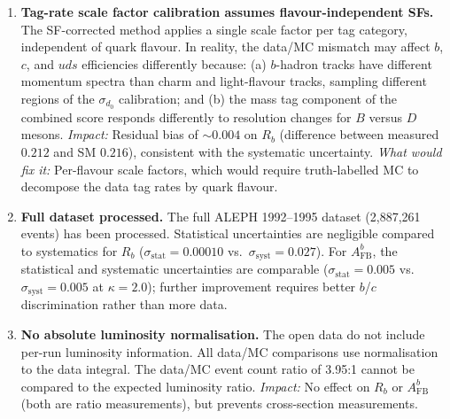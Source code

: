 \documentclass[11pt,a4paper]{article}
\begin{document}
\begin{enumerate}
\item \textbf{Tag-rate scale factor calibration assumes
  flavour-independent SFs.}
  The SF-corrected method applies a single scale factor per
  tag category, independent of quark flavour.
  In reality, the data/MC mismatch may affect $b$, $c$, and
  $uds$ efficiencies differently because:
  (a) $b$-hadron tracks have different momentum spectra than
  charm and light-flavour tracks, sampling different regions of
  the $\sigma_{d_0}$ calibration; and
  (b) the mass tag component of the combined score responds
  differently to resolution changes for $B$ versus $D$ mesons.
  \textit{Impact:} Residual bias of $\sim 0.004$ on $R_b$
  (difference between measured $0.212$ and SM $0.216$),
  consistent with the systematic uncertainty.
  \textit{What would fix it:} Per-flavour scale factors, which
  would require truth-labelled MC to decompose the data tag rates
  by quark flavour.

\item \textbf{Full dataset processed.}
  The full ALEPH 1992--1995 dataset (2,887,261 events) has been
  processed.  Statistical uncertainties are negligible compared
  to systematics for $R_b$ ($\sigma_\text{stat} = 0.00010$ vs.\
  $\sigma_\text{syst} = 0.027$).
  For $A_\text{FB}^b$, the statistical and systematic uncertainties
  are comparable ($\sigma_\text{stat} = 0.005$ vs.\
  $\sigma_\text{syst} = 0.005$ at $\kappa = 2.0$);
  further improvement requires better $b$/$c$ discrimination
  rather than more data.

\item \textbf{No absolute luminosity normalisation.}
  The open data do not include per-run luminosity information.
  All data/MC comparisons use normalisation to the data integral.
  The data/MC event count ratio of 3.95:1 cannot be compared to
  the expected luminosity ratio.
  \textit{Impact:} No effect on $R_b$ or $A_\text{FB}^b$ (both
  are ratio measurements), but prevents cross-section
  measurements.

\end{enumerate}

\clearpage


\clearpage
\appendix
\end{document}
